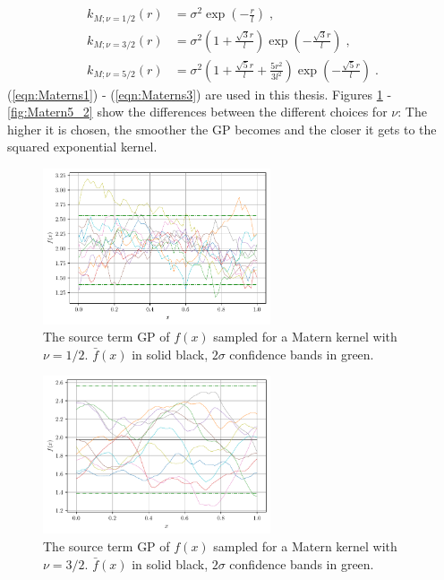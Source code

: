 \documentclass[%
  a4paper,oneside,%
  11pt,%
  smallchapters,
  green,%
  rgb, <cmyk>
  ]{tubsbook}
\begin{document}
\begin{align}
k_{M;\nu = 1/2}(r) &=   \sigma^2 \exp(- \frac{r}{l})  \; , \\
\label{eqn:Materns1}
k_{M;\nu = 3/2}(r) &=  \sigma^2 \left(      1+ \frac{\sqrt{3}r}{l}  	\right)  \exp(- \frac{\sqrt{3} r}{l})  \; , \\
k_{M;\nu = 5/2}(r) &=  \sigma^2\left(      1+ \frac{\sqrt{5}r}{l}  + \frac{5r^2}{3l^2}	\right)  \exp(- \frac{\sqrt{5} r}{l}) \; .
\label{eqn:Materns3}
\end{align}
%
(\ref{eqn:Materns1}) - (\ref{eqn:Materns3}) are used in this thesis. Figures \ref{fig:Matern1_2} - \ref{fig:Matern5_2} show the differences between the different choices for $\nu$: The higher it is chosen, the smoother the GP becomes and the closer it gets to the squared exponential kernel.
\begin{figure}[h]
\begin{center}

\includegraphics[width=0.6\textwidth]{pics/matern1_2_f_sampled}
\caption{The source term GP of $f(x)$ sampled for a Matern kernel with $\nu=1/2$. $\bar{f}(x)$ in solid black, $2\sigma$ confidence bands in green.}
\label{fig:Matern1_2}

\end{center}
\end{figure}

\begin{figure}[h]
\begin{center}

\includegraphics[width=0.6\textwidth]{pics/matern3_2_f_sampled}
\caption{The source term GP of $f(x)$ sampled for a Matern kernel with $\nu=3/2$. $\bar{f}(x)$ in solid black, $2\sigma$ confidence bands in green.}
\label{fig:Matern3_2}

\end{center}
\end{figure}
\end{document}
